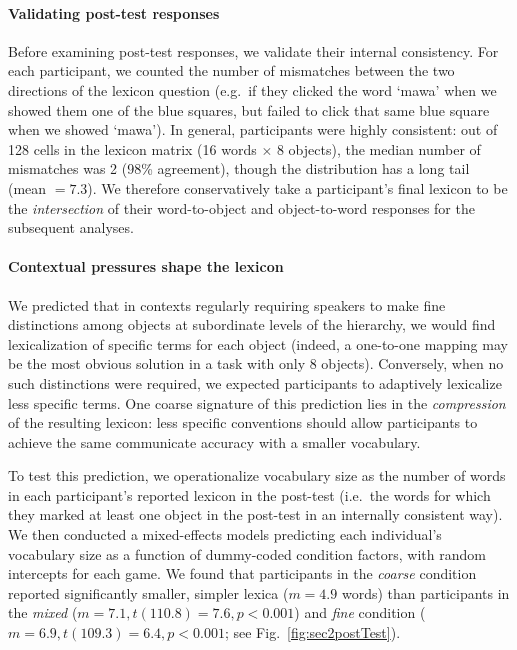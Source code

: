 \paragraph{Validating post-test responses}

Before examining post-test responses, we validate their internal consistency.
For each participant, we counted the number of mismatches between the two directions of the lexicon question (e.g.\ if they clicked the word `mawa' when we showed them one of the blue squares, but failed to click that same blue square when we showed `mawa'). 
In general, participants were highly consistent: out of 128 cells in the lexicon matrix (16 words $\times$ 8 objects), the median number of mismatches was 2 (98\% agreement), though the distribution has a long tail (mean $= 7.3$). 
We therefore conservatively take a participant's final lexicon to be the \emph{intersection} of their word-to-object and object-to-word responses for the subsequent analyses.

\paragraph{Contextual pressures shape the lexicon}

We predicted that in contexts regularly requiring speakers to make fine distinctions among objects at subordinate levels of the hierarchy, we would find lexicalization of specific terms for each object (indeed, a one-to-one mapping may be the most obvious solution in a task with only 8 objects). 
Conversely, when no such distinctions were required, we expected participants to adaptively lexicalize less specific terms.
One coarse signature of this prediction lies in the \emph{compression} of the resulting lexicon: less specific conventions should allow participants to achieve the same communicate accuracy with a smaller vocabulary.

To test this prediction, we operationalize vocabulary size as the number of words in each participant's reported lexicon in the post-test (i.e.\ the words for which they marked at least one object in the post-test in an internally consistent way). 
We then conducted a mixed-effects models predicting each individual's vocabulary size as a function of dummy-coded condition factors, with random intercepts for each game. 
We found that participants in the \emph{coarse} condition reported significantly smaller, simpler lexica ($m = 4.9$ words) than participants in the \emph{mixed} ($m=7.1, t(110.8)=7.6, p < 0.001$) and \emph{fine} condition ($m = 6.9, t(109.3) = 6.4, p < 0.001$; see Fig.\ \ref{fig:sec2postTest}). 

